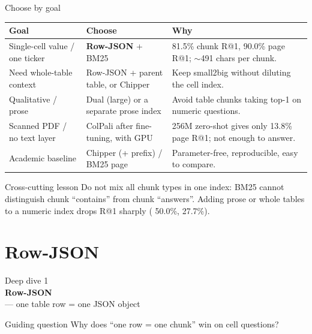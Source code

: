 \documentclass[aspectratio=169,11pt]{beamer}
\newcommand{\code}[1]{\texttt{\detokenize{#1}}}
\begin{document}
\begin{frame}{Choose by goal}
  \begin{center}
  \scriptsize
  \setlength{\tabcolsep}{3pt}
  \renewcommand{\arraystretch}{1.10}
  \begin{tabular}{@{}L{0.21\textwidth}L{0.25\textwidth}L{0.46\textwidth}@{}}
    \toprule
    \textbf{Goal} & \textbf{Choose} & \textbf{Why} \\
    \midrule
    Single-cell value / one ticker & \textbf{Row-JSON} + BM25 &
      81.5\% chunk R@1, 90.0\% page R@1; $\sim$491 chars per chunk. \\
    Need whole-table context & Row-JSON + parent table, or Chipper &
      Keep small2big without diluting the cell index. \\
    Qualitative / prose & Dual (large) or a separate prose index &
      Avoid table chunks taking top-1 on numeric questions. \\
    Scanned PDF / no text layer & ColPali after fine-tuning, with GPU &
      256M zero-shot gives only 13.8\% page R@1; not enough to answer. \\
    Academic baseline & Chipper (+ prefix) / BM25 page &
      Parameter-free, reproducible, easy to compare. \\
    \bottomrule
  \end{tabular}
  \end{center}

  \begin{alertblock}{Cross-cutting lesson}
    \footnotesize
    Do not mix all chunk types in one index: BM25 cannot distinguish chunk
    ``contains'' from chunk ``answers''. Adding prose or whole tables to a
    numeric index drops R@1 sharply (\code{dual} 50.0\%, \code{chipper} 27.7\%).
  \end{alertblock}
\end{frame}

\section{Row-JSON}

\begin{frame}[plain]
  \vfill
  \begin{center}
    {\color{brand}\Large Deep dive 1}\\[0.5em]
    {\Huge\bfseries Row-JSON}\\[0.45em]
    {\large \code{row_json} --- one table row = one JSON object}
  \end{center}
  \vfill
  \begin{block}{Guiding question}
    \centering
    Why does ``one row = one chunk'' win on cell questions?
  \end{block}
\end{frame}
\end{document}
